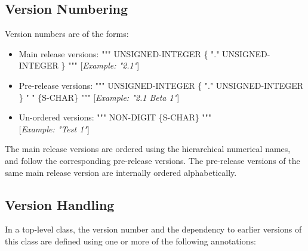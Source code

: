 \documentclass[10pt,a4paper]{report}
\def\doublelabel#1{\label{#1}}
\begin{document}
\subsection{Version Numbering}\doublelabel{version-numbering}

Version numbers are of the forms:

\begin{itemize}
\item
  Main release versions: """ UNSIGNED-INTEGER \{ "." UNSIGNED-INTEGER \}
  """ {[}\emph{Example: "2.1"}{]}
\item
  Pre-release versions: """ UNSIGNED-INTEGER \{ "." UNSIGNED-INTEGER \}
  " " \{S-CHAR\} """ {[}\emph{Example: "2.1 Beta 1"}{]}
\item
  Un-ordered versions: """ NON-DIGIT \{S-CHAR\} """\\
  {[}\emph{Example: "Test 1"}{]}
\end{itemize}

The main release versions are ordered using the hierarchical numerical
names, and follow the corresponding pre-release versions. The
pre-release versions of the same main release version are internally
ordered alphabetically.

\subsection{Version Handling}\doublelabel{version-handling}

In a top-level class, the version number and the dependency to earlier
versions of this class are defined using one or more of the following
annotations:
\end{document}
